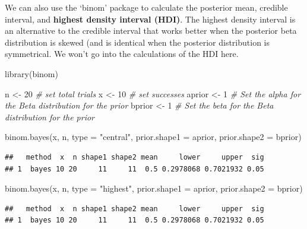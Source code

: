 \documentclass[
  oneside]{book}
\newenvironment{Shaded}{\begin{snugshade}}{\end{snugshade}}
\newcommand{\AttributeTok}[1]{\textcolor[rgb]{0.77,0.63,0.00}{#1}}
\newcommand{\CommentTok}[1]{\textcolor[rgb]{0.56,0.35,0.01}{\textit{#1}}}
\newcommand{\DecValTok}[1]{\textcolor[rgb]{0.00,0.00,0.81}{#1}}
\newcommand{\FunctionTok}[1]{\textcolor[rgb]{0.00,0.00,0.00}{#1}}
\newcommand{\NormalTok}[1]{#1}
\newcommand{\OtherTok}[1]{\textcolor[rgb]{0.56,0.35,0.01}{#1}}
\newcommand{\StringTok}[1]{\textcolor[rgb]{0.31,0.60,0.02}{#1}}
\begin{document}
We can also use the `binom' package to calculate the posterior mean, credible interval, and \textbf{highest density interval (HDI)}. The highest density interval is an alternative to the credible interval that works better when the posterior beta distribution is skewed (and is identical when the posterior distribution is symmetrical. We won't go into the calculations of the HDI here.

\begin{Shaded}
\begin{Highlighting}[]
\FunctionTok{library}\NormalTok{(binom)}

\NormalTok{n }\OtherTok{\textless{}{-}} \DecValTok{20} \CommentTok{\# set total trials}
\NormalTok{x }\OtherTok{\textless{}{-}} \DecValTok{10} \CommentTok{\# set successes}
\NormalTok{aprior }\OtherTok{\textless{}{-}} \DecValTok{1} \CommentTok{\# Set the alpha for the Beta distribution for the prior}
\NormalTok{bprior }\OtherTok{\textless{}{-}} \DecValTok{1} \CommentTok{\# Set the beta for the Beta distribution for the prior}

\FunctionTok{binom.bayes}\NormalTok{(x, n, }\AttributeTok{type =} \StringTok{"central"}\NormalTok{, }\AttributeTok{prior.shape1 =}\NormalTok{ aprior, }\AttributeTok{prior.shape2 =}\NormalTok{ bprior)}
\end{Highlighting}
\end{Shaded}

\begin{verbatim}
##   method  x  n shape1 shape2 mean     lower     upper  sig
## 1  bayes 10 20     11     11  0.5 0.2978068 0.7021932 0.05
\end{verbatim}

\begin{Shaded}
\begin{Highlighting}[]
\FunctionTok{binom.bayes}\NormalTok{(x, n, }\AttributeTok{type =} \StringTok{"highest"}\NormalTok{, }\AttributeTok{prior.shape1 =}\NormalTok{ aprior, }\AttributeTok{prior.shape2 =}\NormalTok{ bprior)}
\end{Highlighting}
\end{Shaded}

\begin{verbatim}
##   method  x  n shape1 shape2 mean     lower     upper  sig
## 1  bayes 10 20     11     11  0.5 0.2978068 0.7021932 0.05
\end{verbatim}
\end{document}
